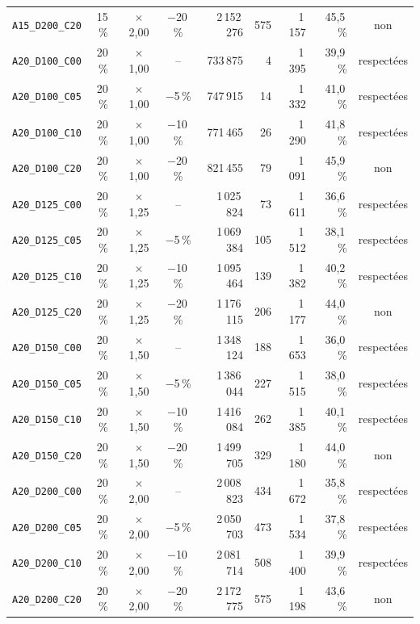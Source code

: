 {\begin{longtable}{lcccrrrrc}
\texttt{A15\_D200\_C20} & 15\,\% & $\times$2{,}00 & $-$20\,\% & 2\,152\,276 & 575 & 1\,157 & 45{,}5\,\% & non \\
\texttt{A20\_D100\_C00} & 20\,\% & $\times$1{,}00 & -- & 733\,875 & 4 & 1\,395 & 39{,}9\,\% & respectées \\
\texttt{A20\_D100\_C05} & 20\,\% & $\times$1{,}00 & $-$5\,\% & 747\,915 & 14 & 1\,332 & 41{,}0\,\% & respectées \\
\texttt{A20\_D100\_C10} & 20\,\% & $\times$1{,}00 & $-$10\,\% & 771\,465 & 26 & 1\,290 & 41{,}8\,\% & respectées \\
\texttt{A20\_D100\_C20} & 20\,\% & $\times$1{,}00 & $-$20\,\% & 821\,455 & 79 & 1\,091 & 45{,}9\,\% & non \\
\texttt{A20\_D125\_C00} & 20\,\% & $\times$1{,}25 & -- & 1\,025\,824 & 73 & 1\,611 & 36{,}6\,\% & respectées \\
\texttt{A20\_D125\_C05} & 20\,\% & $\times$1{,}25 & $-$5\,\% & 1\,069\,384 & 105 & 1\,512 & 38{,}1\,\% & respectées \\
\texttt{A20\_D125\_C10} & 20\,\% & $\times$1{,}25 & $-$10\,\% & 1\,095\,464 & 139 & 1\,382 & 40{,}2\,\% & respectées \\
\texttt{A20\_D125\_C20} & 20\,\% & $\times$1{,}25 & $-$20\,\% & 1\,176\,115 & 206 & 1\,177 & 44{,}0\,\% & non \\
\texttt{A20\_D150\_C00} & 20\,\% & $\times$1{,}50 & -- & 1\,348\,124 & 188 & 1\,653 & 36{,}0\,\% & respectées \\
\texttt{A20\_D150\_C05} & 20\,\% & $\times$1{,}50 & $-$5\,\% & 1\,386\,044 & 227 & 1\,515 & 38{,}0\,\% & respectées \\
\texttt{A20\_D150\_C10} & 20\,\% & $\times$1{,}50 & $-$10\,\% & 1\,416\,084 & 262 & 1\,385 & 40{,}1\,\% & respectées \\
\texttt{A20\_D150\_C20} & 20\,\% & $\times$1{,}50 & $-$20\,\% & 1\,499\,705 & 329 & 1\,180 & 44{,}0\,\% & non \\
\texttt{A20\_D200\_C00} & 20\,\% & $\times$2{,}00 & -- & 2\,008\,823 & 434 & 1\,672 & 35{,}8\,\% & respectées \\
\texttt{A20\_D200\_C05} & 20\,\% & $\times$2{,}00 & $-$5\,\% & 2\,050\,703 & 473 & 1\,534 & 37{,}8\,\% & respectées \\
\texttt{A20\_D200\_C10} & 20\,\% & $\times$2{,}00 & $-$10\,\% & 2\,081\,714 & 508 & 1\,400 & 39{,}9\,\% & respectées \\
\texttt{A20\_D200\_C20} & 20\,\% & $\times$2{,}00 & $-$20\,\% & 2\,172\,775 & 575 & 1\,198 & 43{,}6\,\% & non \\
\end{longtable}
}

